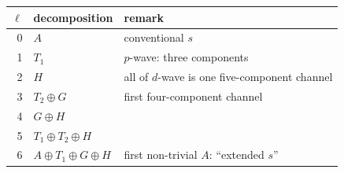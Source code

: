\begin{tabular}{rll}
\hline
$\ell$ & decomposition & remark \\
\hline
0 & $A$ & conventional $s$ \\
1 & $T_1$ & $p$-wave: three components \\
2 & $H$ & all of $d$-wave is one five-component channel \\
3 & $T_2 \oplus G$ & first four-component channel \\
4 & $G \oplus H$ &  \\
5 & $T_1 \oplus T_2 \oplus H$ &  \\
6 & $A \oplus T_1 \oplus G \oplus H$ & first non-trivial $A$: ``extended $s$'' \\
\hline
\end{tabular}
